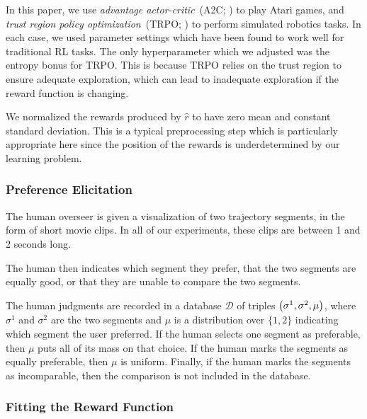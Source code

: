 \documentclass{article}
\def\rest{\hat{r}}  %
\DeclarePairedDelimiter{\pdelims}{(}{)}
\newcommand{\of}[1]{\pdelims*{#1}}
\newcommand{\db}{\mathcal{D}}
\begin{document}
In this paper, we use \emph{advantage actor-critic}~(A2C; \citealp{Mnih16}) to play Atari games,
and \emph{trust region policy optimization}~(TRPO; \citealp{Schulman15})
to perform simulated robotics tasks.
In each case, we used parameter settings which have been found to work well for traditional RL tasks.
The only hyperparameter which we adjusted was the entropy bonus for TRPO.
This is because TRPO relies on the trust region to ensure adequate exploration,
which can lead
to inadequate exploration if the reward function is changing.

We normalized the rewards produced by $\rest$ to have zero mean and constant standard deviation.
This is a typical preprocessing step which is particularly appropriate here since the position of the rewards is underdetermined by our learning problem.


\subsubsection{Preference Elicitation}

The human overseer is given a visualization of two trajectory segments,
in the form of short movie clips.
In all of our experiments, these clips are between 1 and 2 seconds long.

The human then indicates which segment they prefer,
that the two segments are equally good, or
that they are unable to compare the two segments.

The human judgments are recorded in a database $\db$ of triples $\of{\sigma^1, \sigma^2, \mu}$,
where $\sigma^1$ and  $\sigma^2$ are the two segments and $\mu$ is a distribution over $\{ 1, 2 \}$ indicating which segment the user preferred.
If the human selects one segment as preferable,
then $\mu$ puts all of its mass on that choice.
If the human marks the segments as equally preferable,
then $\mu$ is uniform.
Finally, if the human marks the segments as incomparable, then the comparison is not included in the database.


\subsubsection{Fitting the Reward Function}
\label{ssec:fitting-reward-function}
\end{document}
